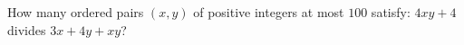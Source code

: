 How many ordered pairs $(x,y)$ of positive integers at most $100$ satisfy: $4xy+4$ divides $3x+4y+xy$?
